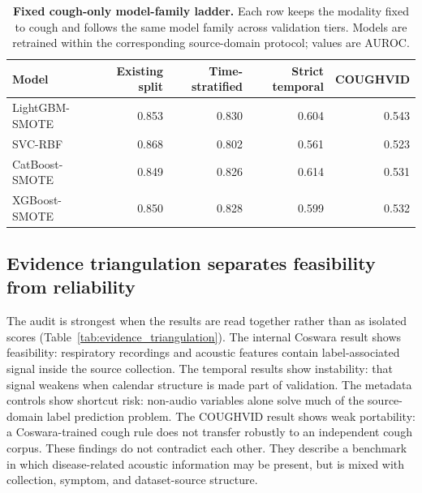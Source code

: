 \documentclass[11pt]{article}
\begin{document}
\begin{table}[t]
\centering
\caption{\textbf{Fixed cough-only model-family ladder.} Each row keeps the modality fixed to cough and follows the same model family across validation tiers. Models are retrained within the corresponding source-domain protocol; values are AUROC.}
\label{tab:fixed_cough_ladder}
\begin{tabular}{lrrrr}
\toprule
Model & Existing split & Time-stratified & Strict temporal & COUGHVID \\
\midrule
LightGBM-SMOTE & 0.853 & 0.830 & 0.604 & 0.543 \\
SVC-RBF & 0.868 & 0.802 & 0.561 & 0.523 \\
CatBoost-SMOTE & 0.849 & 0.826 & 0.614 & 0.531 \\
XGBoost-SMOTE & 0.850 & 0.828 & 0.599 & 0.532 \\
\bottomrule
\end{tabular}
\end{table}

\subsection*{Evidence triangulation separates feasibility from reliability}

The audit is strongest when the results are read together rather than as isolated scores (Table~\ref{tab:evidence_triangulation}). The internal Coswara result shows feasibility: respiratory recordings and acoustic features contain label-associated signal inside the source collection. The temporal results show instability: that signal weakens when calendar structure is made part of validation. The metadata controls show shortcut risk: non-audio variables alone solve much of the source-domain label prediction problem. The COUGHVID result shows weak portability: a Coswara-trained cough rule does not transfer robustly to an independent cough corpus. These findings do not contradict each other. They describe a benchmark in which disease-related acoustic information may be present, but is mixed with collection, symptom, and dataset-source structure.
\end{document}
